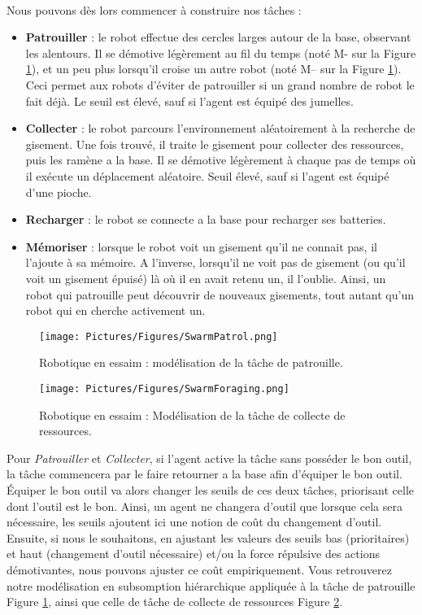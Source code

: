 		\paragraph{}
		Nous pouvons dès lors commencer à construire nos tâches :
		\begin{itemize}
			\item \textbf{Patrouiller} : le robot effectue des cercles larges autour de la base, observant les alentours. Il se démotive légèrement au fil du temps (noté M- sur la Figure \ref{swarmPatrol}), et un peu plus lorsqu'il croise un autre robot (noté M-- sur la Figure \ref{swarmPatrol}). Ceci permet aux robots d'éviter de patrouiller si un grand nombre de robot le fait déjà. Le seuil est élevé, sauf si l'agent est équipé des jumelles.
			\item \textbf{Collecter} : le robot parcours l'environnement aléatoirement à la recherche de gisement. Une fois trouvé, il traite le gisement pour collecter des ressources, puis les ramène a la base. Il se démotive légèrement à chaque pas de temps où il exécute un déplacement aléatoire. Seuil élevé, sauf si l'agent est équipé d'une pioche.
			\item \textbf{Recharger} : le robot se connecte a la base pour recharger ses batteries.
			\item \textbf{Mémoriser} : lorsque le robot voit un gisement qu'il ne connait pas, il l'ajoute à sa mémoire. A l'inverse, lorsqu'il ne voit pas de gisement (ou qu'il voit un gisement épuisé) là où il en avait retenu un, il l'oublie. Ainsi, un robot qui patrouille peut découvrir de nouveaux gisements, tout autant qu'un robot qui en cherche activement un.
		\end{itemize}
	
	\begin{figure}
	\centering
	\texttt{[image: Pictures/Figures/SwarmPatrol.png]}
	\caption{Robotique en essaim : modélisation de la tâche de patrouille.}
	\label{swarmPatrol}
	\end{figure}
	
	\begin{figure}	
	\centering
	\texttt{[image: Pictures/Figures/SwarmForaging.png]}
	\caption{Robotique en essaim : Modélisation de la tâche de collecte de ressources.}
	\label{swarmForaging}
	\end{figure}
		
		Pour \textit{Patrouiller} et \textit{Collecter}, si l'agent active la tâche sans posséder le bon outil, la tâche commencera par le faire retourner a la base afin d'équiper le bon outil. Équiper le bon outil va alors changer les seuils de ces deux tâches, priorisant celle dont l'outil est le bon. Ainsi, un agent ne changera d'outil que lorsque cela sera nécessaire, les seuils ajoutent ici une notion de coût du changement d'outil. Ensuite, si nous le souhaitons, en ajustant les valeurs des seuils bas (prioritaires) et haut (changement d'outil nécessaire) et/ou la force répulsive des actions démotivantes, nous pouvons ajuster ce coût empiriquement. Vous retrouverez notre modélisation en subsomption hiérarchique appliquée à la tâche de patrouille Figure \ref{swarmPatrol}, ainsi que celle de tâche de collecte de ressources Figure \ref{swarmForaging}.
		
